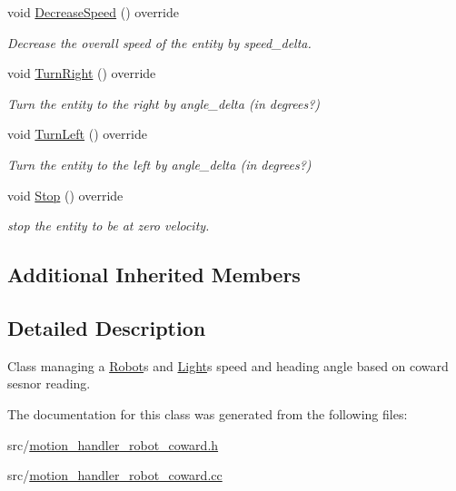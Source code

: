 \begin{DoxyCompactItemize}
void \mbox{\hyperlink{class_motion_handler_robot_coward_ad8280dc0f2bcdaf93b68ae87447cdef4}{Decrease\+Speed}} () override
\begin{DoxyCompactList}\small\item\em Decrease the overall speed of the entity by speed\+\_\+delta. \end{DoxyCompactList}\item 
\mbox{\label{class_motion_handler_robot_coward_ad1244c83f6c9f81d28f1080dbe955e89}} 
void \mbox{\hyperlink{class_motion_handler_robot_coward_ad1244c83f6c9f81d28f1080dbe955e89}{Turn\+Right}} () override
\begin{DoxyCompactList}\small\item\em Turn the entity to the right by angle\+\_\+delta (in degrees?) \end{DoxyCompactList}\item 
\mbox{\label{class_motion_handler_robot_coward_af0f39f6289c90aa5d8e1db3fee3bf6f0}} 
void \mbox{\hyperlink{class_motion_handler_robot_coward_af0f39f6289c90aa5d8e1db3fee3bf6f0}{Turn\+Left}} () override
\begin{DoxyCompactList}\small\item\em Turn the entity to the left by angle\+\_\+delta (in degrees?) \end{DoxyCompactList}\item 
\mbox{\label{class_motion_handler_robot_coward_a532bf275aa6bd551378c581a890ba54f}} 
void \mbox{\hyperlink{class_motion_handler_robot_coward_a532bf275aa6bd551378c581a890ba54f}{Stop}} () override
\begin{DoxyCompactList}\small\item\em stop the entity to be at zero velocity. \end{DoxyCompactList}\end{DoxyCompactItemize}
\subsection*{Additional Inherited Members}


\subsection{Detailed Description}
Class managing a \mbox{\hyperlink{class_robot}{Robot}}\textquotesingle{}s and \mbox{\hyperlink{class_light}{Light}}\textquotesingle{}s speed and heading angle based on coward sesnor reading. 

The documentation for this class was generated from the following files\+:\begin{DoxyCompactItemize}
\item 
src/\mbox{\hyperlink{motion__handler__robot__coward_8h}{motion\+\_\+handler\+\_\+robot\+\_\+coward.\+h}}\item 
src/\mbox{\hyperlink{motion__handler__robot__coward_8cc}{motion\+\_\+handler\+\_\+robot\+\_\+coward.\+cc}}\end{DoxyCompactItemize}
